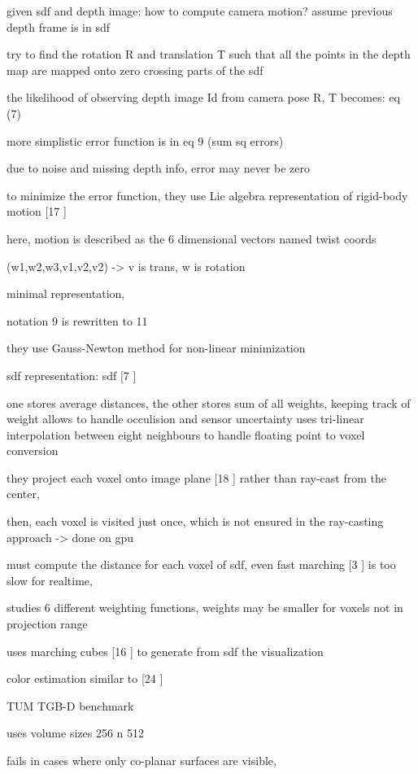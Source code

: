 given sdf and depth image: how to compute camera motion?
assume previous depth frame is in sdf

try to find the rotation R and translation T such that all the points in the depth map are mapped onto zero crossing parts of the sdf

the likelihood of observing depth image Id from camera pose R, T becomes: eq (7)

more simplistic error function is in eq 9 (sum sq errors)

due to noise and missing depth info, error may never be zero

to minimize the error function, they use Lie algebra representation of rigid-body motion [17 \cite{Ma12Invitation}]

here, motion is described as the 6 dimensional vectors named twist coords

(w1,w2,w3,v1,v2,v2) -> v is trans, w is rotation

minimal representation,

notation 9 is rewritten to 11

they use Gauss-Newton method for non-linear minimization

sdf representation:
sdf [7 \cite{Curless96Volumetric} ]

one stores average distances, the other stores sum of all weights, keeping track of weight allows to handle occulision and sensor uncertainty
uses tri-linear interpolation between eight neighbours to handle floating point to voxel conversion

they project each voxel onto image plane [18 \cite{Newcombe11Kinectfusion}] rather than ray-cast from the center,

then, each voxel is visited just once, which is not ensured in the ray-casting approach -> done on gpu

must compute the distance for each voxel of sdf, even fast marching [3 \cite{Baerentzen01Implementation}] is too slow for realtime,

studies 6 different weighting functions, weights may be smaller for voxels not in projection range

uses marching cubes [16 \cite{Lorensen87Marching} ] to generate from sdf the visualization

color estimation similar to [24 \cite{Whelan13Robust}]

TUM TGB-D benchmark

uses volume sizes 256 n 512

fails in cases where only co-planar surfaces are visible,


